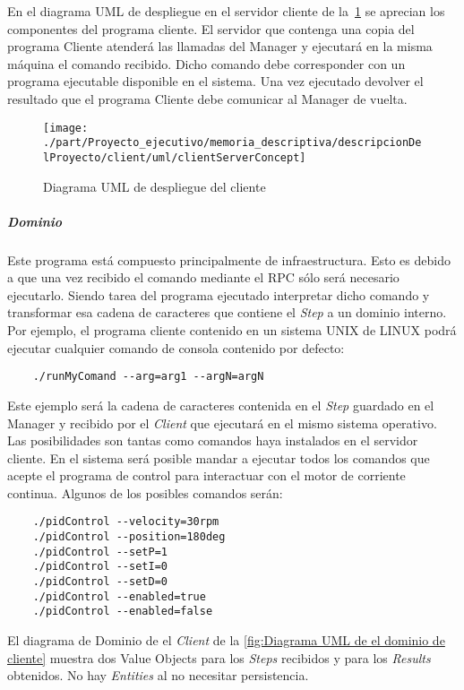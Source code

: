
En el diagrama UML de despliegue en el servidor cliente de la~\cref{fig:Diagrama UML de despliegue del cliente} se aprecian los componentes del programa cliente.
El servidor que contenga una copia del programa Cliente atenderá las llamadas del Manager y ejecutará en la misma máquina el comando recibido.
Dicho comando debe corresponder con un programa ejecutable disponible en el sistema.
Una vez ejecutado devolver el resultado que el programa Cliente debe comunicar al Manager de vuelta.

\begin{figure}[H]
    \centering
    \texttt{[image: ./part/Proyecto\_ejecutivo/memoria\_descriptiva/descripcionDelProyecto/client/uml/clientServerConcept]}
    \caption{Diagrama UML de despliegue del cliente}\label{fig:Diagrama UML de despliegue del cliente}
\end{figure}

\subparagraph{Dominio}

Este programa está compuesto principalmente de infraestructura.
Esto es debido a que una vez recibido el comando mediante el RPC sólo será necesario ejecutarlo.
Siendo tarea del programa ejecutado interpretar dicho comando y transformar esa cadena de caracteres que contiene el \textit{Step} a un dominio interno.
Por ejemplo, el programa cliente contenido en un sistema UNIX de LINUX podrá ejecutar cualquier comando de consola contenido por defecto:

\begin{verbatim}
    ./runMyComand --arg=arg1 --argN=argN
\end{verbatim}

Este ejemplo será la cadena de caracteres contenida en el \textit{Step} guardado en el Manager y recibido por el \textit{Client} que ejecutará en el mismo sistema operativo.
Las posibilidades son tantas como comandos haya instalados en el servidor cliente.
En el sistema será posible mandar a ejecutar todos los comandos que acepte el programa de control para interactuar con el motor de corriente continua.
Algunos de los posibles comandos serán:

\begin{verbatim}
    ./pidControl --velocity=30rpm
    ./pidControl --position=180deg
    ./pidControl --setP=1
    ./pidControl --setI=0
    ./pidControl --setD=0
    ./pidControl --enabled=true
    ./pidControl --enabled=false
\end{verbatim}

El diagrama de Dominio de el \textit{Client} de la \cref{fig:Diagrama UML de el dominio de cliente} muestra dos Value Objects para los \textit{Steps} recibidos y para los \textit{Results} obtenidos.
No hay \textit{Entities} al no necesitar persistencia.

